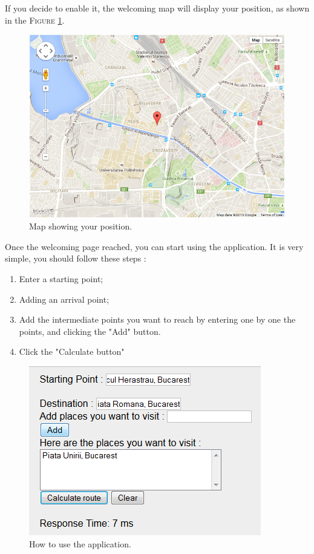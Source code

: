 		If you decide to enable it, the welcoming map will display your position, as shown in the \textsc{Figure} \ref{fig:geoloc_map}.
		\begin{figure}[h!]
			\centering
			\includegraphics[scale=0.7]{input/geoloc_map.png}
			\caption{\label{fig:geoloc_map}Map showing your position.}
		\end{figure}
		
		Once the welcoming page reached, you can start using the application. It is very simple, you should follow these steps :
		\begin{enumerate}
			\item Enter a starting point;
			\item Adding an arrival point;
			\item Add the intermediate points you want to reach by entering one by one the points, and clicking the "Add" button.
			\item Click the "Calculate button"
		\end{enumerate}
		
		\begin{figure}[h!]
			\centering
			\includegraphics[scale=0.7]{input/make_route.png}
			\caption{\label{fig:route}How to use the application.}
		\end{figure}
		
